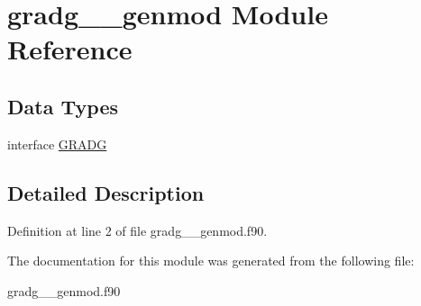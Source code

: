 \hypertarget{classgradg____genmod}{\section{gradg\+\_\+\+\_\+genmod Module Reference}
\label{classgradg____genmod}
}
\subsection*{Data Types}
\begin{DoxyCompactItemize}
\item 
interface \hyperlink{interfacegradg____genmod_1_1_g_r_a_d_g}{G\+R\+A\+D\+G}
\end{DoxyCompactItemize}


\subsection{Detailed Description}


Definition at line 2 of file gradg\+\_\+\+\_\+genmod.\+f90.



The documentation for this module was generated from the following file\+:\begin{DoxyCompactItemize}
\item 
gradg\+\_\+\+\_\+genmod.\+f90\end{DoxyCompactItemize}
